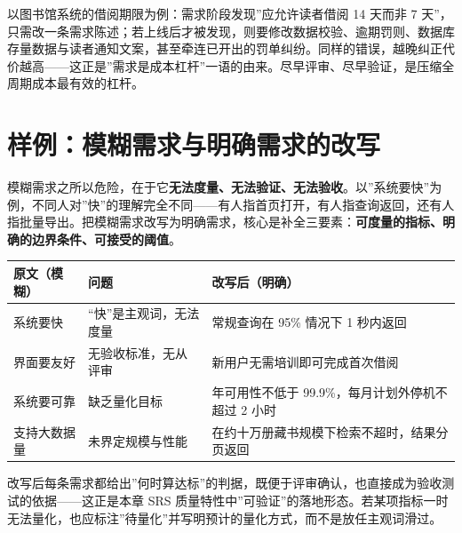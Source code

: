 \documentclass[
]{ctexbook}
\newcounter{none}
\begin{document}
以图书馆系统的借阅期限为例：需求阶段发现''应允许读者借阅 14 天而非 7
天''，只需改一条需求陈述；若上线后才被发现，则要修改数据校验、逾期罚则、数据库存量数据与读者通知文案，甚至牵连已开出的罚单纠纷。同样的错误，越晚纠正代价越高------这正是''需求是成本杠杆''一语的由来。尽早评审、尽早验证，是压缩全周期成本最有效的杠杆。

\section{样例：模糊需求与明确需求的改写}\label{ux6837ux4f8bux6a21ux7ccaux9700ux6c42ux4e0eux660eux786eux9700ux6c42ux7684ux6539ux5199}

模糊需求之所以危险，在于它\textbf{无法度量、无法验证、无法验收}。以''系统要快''为例，不同人对''快''的理解完全不同------有人指首页打开，有人指查询返回，还有人指批量导出。把模糊需求改写为明确需求，核心是补全三要素：\textbf{可度量的指标、明确的边界条件、可接受的阈值}。

{\def\LTcaptype{none} %
\begin{longtable}[]{@{}
  >{\raggedright\arraybackslash}p{}
  >{\raggedright\arraybackslash}p{}
  >{\raggedright\arraybackslash}p{}@{}}
\toprule\noalign{}
\begin{minipage}[b]{\linewidth}\raggedright
原文（模糊）
\end{minipage} & \begin{minipage}[b]{\linewidth}\raggedright
问题
\end{minipage} & \begin{minipage}[b]{\linewidth}\raggedright
改写后（明确）
\end{minipage} \\
\midrule\noalign{}
\endhead
\bottomrule\noalign{}
\endlastfoot
系统要快 & ``快''是主观词，无法度量 & 常规查询在 95\% 情况下 1
秒内返回 \\
界面要友好 & 无验收标准，无从评审 & 新用户无需培训即可完成首次借阅 \\
系统要可靠 & 缺乏量化目标 & 年可用性不低于 99.9\%，每月计划外停机不超过
2 小时 \\
支持大数据量 & 未界定规模与性能 &
在约十万册藏书规模下检索不超时，结果分页返回 \\
\end{longtable}
}

改写后每条需求都给出''何时算达标''的判据，既便于评审确认，也直接成为验收测试的依据------这正是本章
SRS
质量特性中''可验证''的落地形态。若某项指标一时无法量化，也应标注''待量化''并写明预计的量化方式，而不是放任主观词滑过。
\end{document}
